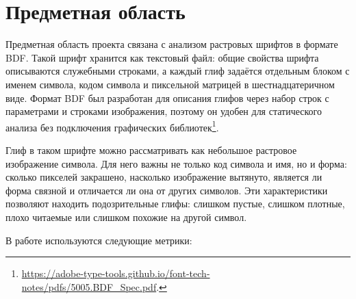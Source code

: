 \section{Предметная область}
\label{sec:domain}

Предметная область проекта связана с анализом растровых шрифтов в формате BDF. Такой шрифт хранится как текстовый файл: общие свойства шрифта описываются служебными строками, а каждый глиф задаётся отдельным блоком с именем символа, кодом символа и пиксельной матрицей в шестнадцатеричном виде. Формат BDF был разработан для описания глифов через набор строк с параметрами и строками изображения, поэтому он удобен для статического анализа без подключения графических библиотек\footnote{\url{https://adobe-type-tools.github.io/font-tech-notes/pdfs/5005.BDF_Spec.pdf}.}.

Глиф в таком шрифте можно рассматривать как небольшое растровое изображение символа. Для него важны не только код символа и имя, но и форма: сколько пикселей закрашено, насколько изображение вытянуто, является ли форма связной и отличается ли она от других символов. Эти характеристики позволяют находить подозрительные глифы: слишком пустые, слишком плотные, плохо читаемые или слишком похожие на другой символ.

В работе используются следующие метрики:

